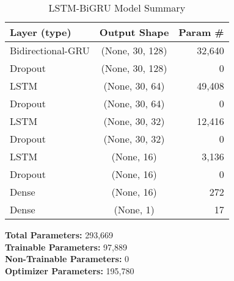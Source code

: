 \begin{table}[H]
\centering
\caption{LSTM-BiGRU Model Summary}
\label{tab:lstmbigru-model-summary}
\begin{tabular}{lcr}
\hline
\textbf{Layer (type)} & \textbf{Output Shape} & \textbf{Param \#} \\
\hline\hline
Bidirectional-GRU & (None, 30, 128) & 32,640 \\
Dropout             & (None, 30, 128) & 0 \\
LSTM                   & (None, 30, 64)  & 49,408 \\
Dropout          & (None, 30, 64)  & 0 \\
LSTM      & (None, 30, 32)  & 12,416 \\
Dropout        & (None, 30, 32)  & 0 \\
LSTM          & (None, 16)      & 3,136 \\
Dropout            & (None, 16)      & 0 \\
Dense       & (None, 16)      & 272 \\
Dense      & (None, 1)       & 17 \\
\hline
\end{tabular}

\vspace{1em}
\noindent
\textbf{Total Parameters:} 293,669 \\
\textbf{Trainable Parameters:} 97,889 \\
\textbf{Non-Trainable Parameters:} 0 \\
\textbf{Optimizer Parameters:} 195,780 
\end{table}
